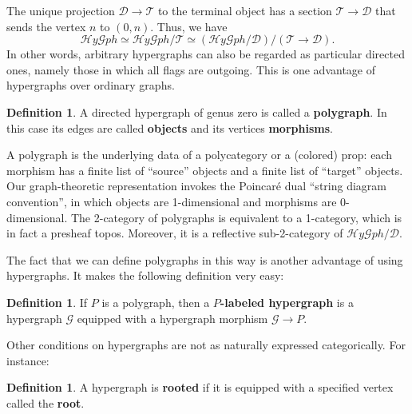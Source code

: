 \documentclass{article}
\theoremstyle{definition}
\newtheorem{defn}[thm]{Definition}
\theoremstyle{remark}
\def\G{\mathcal{G}}
\def\hy{\mathcal{H}\mathit{y}\mathcal{G}\mathit{ph}}
\def\thy{\mathcal{T}}
\def\dhy{\mathcal{D}}
\begin{document}
The unique projection $\dhy\to\thy$ to the terminal object has a section $\thy\to\dhy$ that sends the vertex $n$ to $(0,n)$.
Thus, we have
\[\hy \simeq \hy/\thy \simeq (\hy/\dhy)/(\thy\to\dhy).\]
In other words, arbitrary hypergraphs can also be regarded as particular directed ones, namely those in which all flags are outgoing.
This is one advantage of hypergraphs over ordinary graphs.

\begin{defn}
  A directed hypergraph of genus zero is called a \textbf{polygraph}.
  In this case its edges are called \textbf{objects} and its vertices \textbf{morphisms}.
\end{defn}

A polygraph is the underlying data of a polycategory or a (colored) prop: each morphism has a finite list of ``source'' objects and a finite list of ``target'' objects.
Our graph-theoretic representation invokes the Poincar\'e dual ``string diagram convention'', in which objects are 1-dimensional and morphisms are 0-dimensional.
The 2-category of polygraphs is equivalent to a 1-category, which is in fact a presheaf topos.
Moreover, it is a reflective sub-2-category of $\hy/\dhy$.

The fact that we can define polygraphs in this way is another advantage of using hypergraphs.
It makes the following definition very easy:

\begin{defn}\label{thm:labeled}
  If $P$ is a polygraph, then a \textbf{$P$-labeled hypergraph} is a hypergraph $\G$ equipped with a hypergraph morphism $\G\to P$.
\end{defn}

Other conditions on hypergraphs are not as naturally expressed categorically.
For instance:

\begin{defn}
  A hypergraph is \textbf{rooted} if it is equipped with a specified vertex called the \textbf{root}.
\end{defn}
\end{document}
